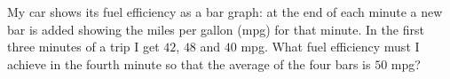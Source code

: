 My car shows its fuel efficiency as a bar graph: at the end of each minute a new bar is added showing the miles per gallon (mpg) for that minute. In the first three minutes of a trip I get $42$, $48$ and $40$ mpg. What fuel efficiency must I achieve in the fourth minute so that the average of the four bars is $50$ mpg?
